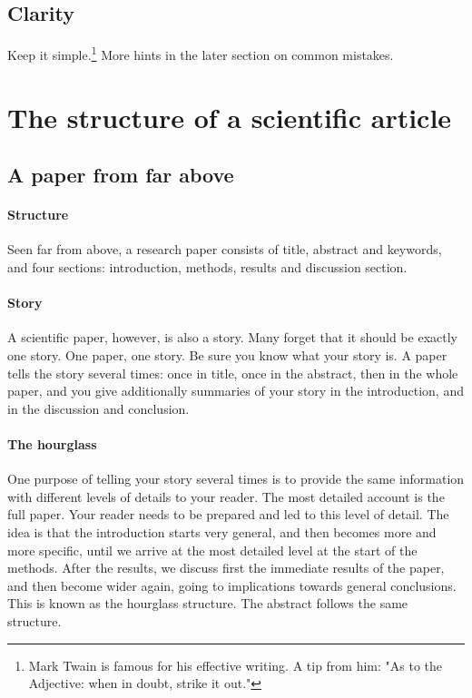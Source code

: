 \documentclass{tufte-book}
\begin{document}
\subsection{Clarity}

Keep it simple.\footnote{Mark Twain is famous for his effective writing. A tip from him: "As to the Adjective: when in doubt, strike it out."} More hints in the later section on common mistakes.

\section{The structure of a scientific article}   

\subsection{A paper from far above}

\paragraph{Structure}Seen far from above, a research paper consists of title, abstract and keywords, and four sections: introduction, methods, results and discussion section. 

\paragraph{Story}A scientific paper, however, is also a story. Many forget that it should be exactly one story. One paper, one story. Be sure you know what your story is. A paper tells the story several times: once in title, once in the abstract, then in the whole paper, and you give additionally summaries of your story in the introduction, and in the discussion and  conclusion.

\paragraph{The hourglass} One purpose of telling your story several times is to provide the same information with different levels of details to your reader. The most detailed account is the full paper. Your reader needs to be prepared and led to this level of detail. The idea is that the introduction starts very general, and then becomes more and more specific, until we arrive at the most detailed level at the start of the methods. After the results, we discuss first the immediate results of the paper, and then become wider again, going to implications towards general conclusions. This is known as the hourglass structure. The abstract follows the same structure. 
 
\end{document}
